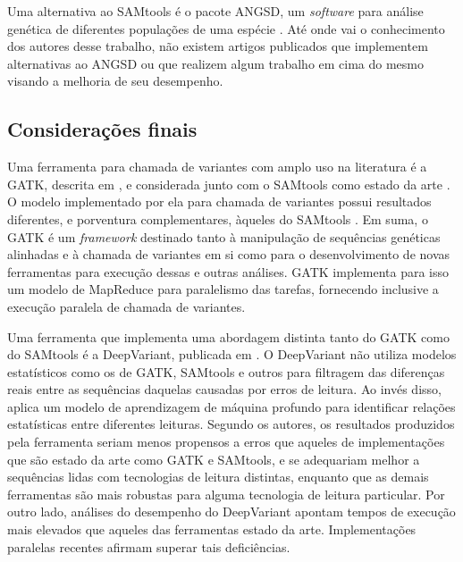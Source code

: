 \documentclass[cic,tc]{iiufrgs}
\begin{document}
Uma alternativa ao SAMtools é o pacote ANGSD, um \textit{software} para análise genética
de diferentes populações de uma espécie \cite{korneliussen2014angsd}. Até onde
vai o conhecimento dos autores desse trabalho, não existem artigos publicados
que implementem alternativas ao ANGSD ou que realizem algum trabalho em cima do
mesmo visando a melhoria de seu desempenho.

\subsection{Considerações finais}
\label{sec:alt}

Uma ferramenta para chamada de variantes com amplo uso na literatura
\cite{de2017gatk} é a GATK, descrita em \cite{mckenna2010genome}, e considerada
junto com o SAMtools como estado da
arte \cite{yao2020evaluation} \cite{poplin2018universal}. O modelo implementado
por ela para chamada de variantes possui resultados diferentes, e porventura
complementares, àqueles do
SAMtools \cite{gezsi2015variantmetacaller} \cite{hwang2015systematic}. Em suma, o
GATK é um \textit{framework} destinado tanto à manipulação de sequências genéticas
alinhadas e à chamada de variantes em si como para o desenvolvimento de novas
ferramentas para execução dessas e outras análises. GATK implementa para isso
um modelo de MapReduce para paralelismo das tarefas, fornecendo inclusive a
execução paralela de chamada de variantes.


Uma ferramenta que implementa uma abordagem distinta tanto do GATK como do
SAMtools é a DeepVariant, publicada em \cite{poplin2018universal}. O DeepVariant
não utiliza modelos estatísticos como os de GATK, SAMtools e outros para
filtragem das diferenças reais entre as sequências daquelas causadas por erros
de leitura. Ao invés disso, aplica um modelo de aprendizagem de máquina
profundo para identificar relações estatísticas entre diferentes leituras.
Segundo os autores, os resultados produzidos pela ferramenta seriam menos
propensos a erros que aqueles de implementações que são estado da arte como
GATK e SAMtools, e se adequariam melhor a sequências lidas com tecnologias de
leitura distintas, enquanto que as demais ferramentas são mais robustas para
alguma tecnologia de leitura particular. Por outro lado, análises do desempenho
do DeepVariant apontam tempos de execução mais elevados que aqueles das
ferramentas estado da arte. Implementações paralelas recentes afirmam superar
tais deficiências. \cite{ahmad2021vc}
\end{document}
